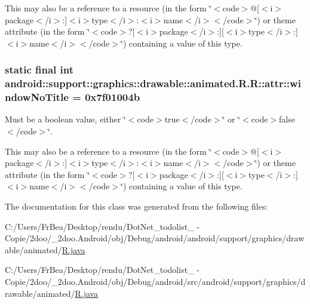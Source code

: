 This may also be a reference to a resource (in the form \char`\"{}$<$code$>$@\mbox{[}$<$i$>$package$<$/i$>$:\mbox{]}$<$i$>$type$<$/i$>$:$<$i$>$name$<$/i$>$$<$/code$>$\char`\"{}) or theme attribute (in the form \char`\"{}$<$code$>$?\mbox{[}$<$i$>$package$<$/i$>$:\mbox{]}\mbox{[}$<$i$>$type$<$/i$>$:\mbox{]}$<$i$>$name$<$/i$>$$<$/code$>$\char`\"{}) containing a value of this type. \hypertarget{classandroid_1_1support_1_1graphics_1_1drawable_1_1animated_1_1_r_1_1attr_5c2b9d40f8c38e1db240d20726c18a61}{
\subsubsection[{windowNoTitle}]{\setlength{\rightskip}{0pt plus 5cm}static final int android::support::graphics::drawable::animated.R.R::attr::windowNoTitle = 0x7f01004b}}
\label{classandroid_1_1support_1_1graphics_1_1drawable_1_1animated_1_1_r_1_1attr_5c2b9d40f8c38e1db240d20726c18a61}


Must be a boolean value, either \char`\"{}$<$code$>$true$<$/code$>$\char`\"{} or \char`\"{}$<$code$>$false$<$/code$>$\char`\"{}. 

This may also be a reference to a resource (in the form \char`\"{}$<$code$>$@\mbox{[}$<$i$>$package$<$/i$>$:\mbox{]}$<$i$>$type$<$/i$>$:$<$i$>$name$<$/i$>$$<$/code$>$\char`\"{}) or theme attribute (in the form \char`\"{}$<$code$>$?\mbox{[}$<$i$>$package$<$/i$>$:\mbox{]}\mbox{[}$<$i$>$type$<$/i$>$:\mbox{]}$<$i$>$name$<$/i$>$$<$/code$>$\char`\"{}) containing a value of this type. 

The documentation for this class was generated from the following files:\begin{CompactItemize}
\item 
C:/Users/FrBea/Desktop/rendu/DotNet\_\-todolist\_ - Copie/2doo/\_\-2doo.Android/obj/Debug/android/android/support/graphics/drawable/animated/\hyperlink{android_2support_2graphics_2drawable_2animated_2_r_8java}{R.java}\item 
C:/Users/FrBea/Desktop/rendu/DotNet\_\-todolist\_ - Copie/2doo/\_\-2doo.Android/obj/Debug/android/src/android/support/graphics/drawable/animated/\hyperlink{src_2android_2support_2graphics_2drawable_2animated_2_r_8java}{R.java}\end{CompactItemize}
